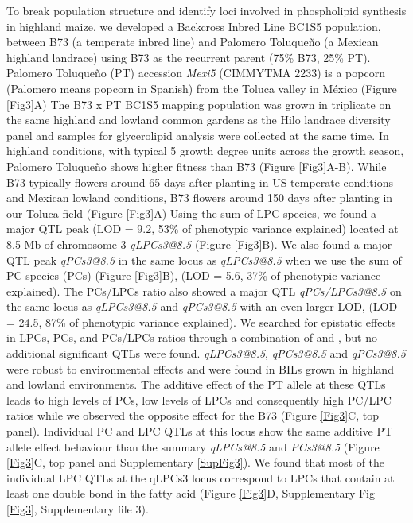 \documentclass[9pt,twocolumn,twoside]{BioRxiv}
\begin{document}
To break population structure and identify loci involved in phospholipid synthesis in highland maize, we developed a Backcross Inbred  Line BC1S5 population, between B73 (a temperate inbred line) and Palomero Toluqueño (a Mexican highland landrace) using B73 as the recurrent parent (75\% B73, 25\% PT). 
Palomero Toluqueño (PT) accession \textit{Mexi5} (CIMMYTMA 2233) is a popcorn (Palomero means popcorn in Spanish) from the Toluca valley in México (Figure \ref{Fig3}A) 
The B73 x PT BC1S5 mapping population was grown in triplicate on the same highland and lowland common gardens as the Hilo landrace diversity panel and samples for glycerolipid analysis were collected at the same time. 
In highland conditions, with typical 5 growth degree units across the growth season, Palomero Toluqueño shows higher fitness than B73 (Figure \ref{Fig3}A-B).
While B73 typically flowers around 65 days after planting in US temperate conditions and Mexican lowland conditions, B73 flowers around 150 days after planting in our Toluca field (Figure \ref{Fig3}A)
Using the sum of LPC species, we found a major QTL peak (LOD = 9.2, 53\% of phenotypic variance explained) located at 8.5 Mb of chromosome 3 \textit{qLPCs3@8.5} (Figure \ref{Fig3}B).
We also found a major QTL peak \textit{qPCs3@8.5} in the same locus as  \textit{qLPCs3@8.5} when we use the sum of PC species (PCs) (Figure \ref{Fig3}B), (LOD = 5.6, 37\% of phenotypic variance explained). 
The PCs/LPCs ratio also showed a major QTL \textit{qPCs/LPCs3@8.5} on the same locus as  \textit{qLPCs3@8.5} and \textit{qPCs3@8.5} with an even larger LOD, (LOD = 24.5, 87\% of phenotypic variance explained). 
We searched for epistatic effects in LPCs, PCs, and PCs/LPCs ratios through a combination of  and , but no additional significant QTLs were found.
\textit{qLPCs3@8.5}, \textit{qPCs3@8.5} and \textit{qPCs3@8.5}  were robust to environmental effects and were found in BILs grown in highland and lowland environments.
The additive effect of the PT allele at these QTLs leads to high levels of PCs, low levels of LPCs and consequently high PC/LPC ratios while we observed the opposite effect for the B73 (Figure \ref{Fig3}C, top panel).
Individual PC and LPC QTLs at this locus show the same additive PT allele effect behaviour than the summary \textit{qLPCs@8.5} and \textit{PCs3@8.5} (Figure \ref{Fig3}C, top panel and Supplementary \ref{SupFig3}).
We found that most of the individual LPC QTLs at the qLPCs3 locus correspond to LPCs that contain at least one double bond in the fatty acid (Figure  \ref{Fig3}D, Supplementary Fig \ref{Fig3}, Supplementary file 3).
\end{document}
